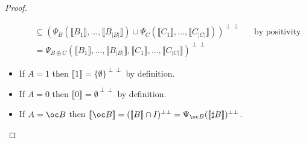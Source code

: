 \documentclass[11pt]{article}
\newcommand\size[1]{{\lvert #1 \rvert}}
\newcommand\sem[1]{{\llbracket #1 \rrbracket}}
\newcommand\biperp{{\perp\perp}}
\begin{document}
\begin{proof}
\begin{itemize}
\begin{align*}
            &\subseteq (\Psi_B(\sem{B_1}, \dots, \sem{B_\size{B}}) \cup \Psi_C(\sem{C_1}, \dots, \sem{C_\size{C}}))^\biperp &&\text{by positivity} \\
            &= \Psi_{B \oplus C}(\sem{B_1}, \dots, \sem{B_\size{B}}, \sem{C_1}, \dots, \sem{C_\size{C}})^\biperp
        \end{align*}
        \item If $A = 1$ then $\sem{1} = \{\emptyset\}^\biperp$ by definition.
        \item If $A = 0$ then $\sem{0} = \emptyset^\biperp$ by definition.
        \item If $A = \oc B$ then $\sem{\oc B} = (\sem{B} \cap I)^\biperp = \Psi_{\oc B}(\sem{\sharp B})^\biperp$.
    \end{itemize}
\end{proof}
\end{document}
